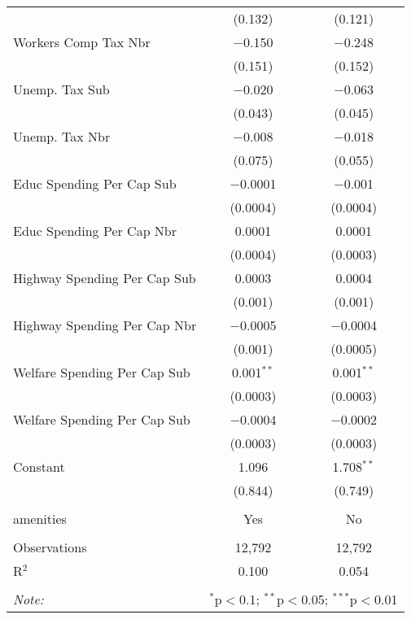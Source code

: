 \begin{table}[!htbp]
\begin{tabular}{@{\extracolsep{5pt}}lcc}
  & (0.132) & (0.121) \\ 
  Workers Comp Tax Nbr & $-$0.150 & $-$0.248 \\ 
  & (0.151) & (0.152) \\ 
  Unemp. Tax Sub & $-$0.020 & $-$0.063 \\ 
  & (0.043) & (0.045) \\ 
  Unemp. Tax Nbr & $-$0.008 & $-$0.018 \\ 
  & (0.075) & (0.055) \\ 
  Educ Spending Per Cap Sub & $-$0.0001 & $-$0.001 \\ 
  & (0.0004) & (0.0004) \\ 
  Educ Spending Per Cap Nbr & 0.0001 & 0.0001 \\ 
  & (0.0004) & (0.0003) \\ 
  Highway Spending Per Cap Sub & 0.0003 & 0.0004 \\ 
  & (0.001) & (0.001) \\ 
  Highway Spending Per Cap Nbr & $-$0.0005 & $-$0.0004 \\ 
  & (0.001) & (0.0005) \\ 
  Welfare Spending Per Cap Sub & 0.001$^{**}$ & 0.001$^{**}$ \\ 
  & (0.0003) & (0.0003) \\ 
  Welfare Spending Per Cap Sub & $-$0.0004 & $-$0.0002 \\ 
  & (0.0003) & (0.0003) \\ 
  Constant & 1.096 & 1.708$^{**}$ \\ 
  & (0.844) & (0.749) \\ 
 \hline \\[-1.8ex] 
amenities & Yes & No \\ 
\hline \\[-1.8ex] 
Observations & 12,792 & 12,792 \\ 
R$^{2}$ & 0.100 & 0.054 \\ 
\hline 
\hline \\[-1.8ex] 
\textit{Note:}  & \multicolumn{2}{r}{$^{*}$p$<$0.1; $^{**}$p$<$0.05; $^{***}$p$<$0.01} \\ 
\end{tabular} 
\end{table} 
